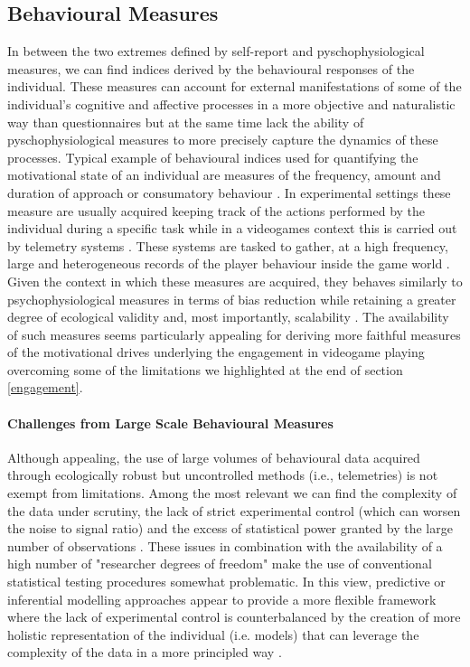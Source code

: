 \subsection{Behavioural Measures}
\label{behavioural_indices}
In between the two extremes defined by self-report and pyschophysiological measures, we can find indices derived by the behavioural responses of the individual. These measures can account for external manifestations of some of the individual's cognitive and affective processes in a more objective and naturalistic way than questionnaires but at the same time lack the ability of pyschophysiological measures to more precisely capture the dynamics of these processes. Typical example of behavioural indices used for quantifying the motivational state of an individual are measures of the frequency, amount and duration of approach or consumatory behaviour \cite{berridge2004motivation, simpson2016behavioral}. In experimental settings these measure are usually acquired keeping track of the actions performed by the individual during a specific task \cite{berridge2009dissecting, simpson2016behavioral} while in a videogames context this is carried out by telemetry systems \cite{el2016game}. These systems are tasked to gather, at a high frequency,  large and heterogeneous records of the player behaviour inside the game world \cite{el2016game}. Given the context in which these measures are acquired, they behaves similarly to psychophysiological measures in terms of bias reduction while retaining a greater degree of ecological validity and, most importantly, scalability \cite{el2016game}. The availability of such measures seems particularly appealing for deriving more faithful measures of the motivational drives underlying the engagement in videogame playing overcoming some of the limitations we highlighted at the end of section \ref{engagement}.
    
\paragraph*{Challenges from Large Scale Behavioural Measures}
\label{challenges_large_scale}
Although appealing, the use of large volumes of behavioural data acquired through ecologically robust but uncontrolled methods (i.e., telemetries) is not exempt from limitations. Among the most relevant we can find the complexity of the data under scrutiny, the lack of strict experimental control (which can worsen the noise to signal ratio) and the excess of statistical power granted by the large number of observations \cite{orben2019association}. These issues in combination with the availability of a high number of "researcher degrees of freedom" \cite{simmons2016false} make the use of conventional statistical testing procedures somewhat problematic. In this view, predictive or inferential modelling approaches appear to provide a more flexible framework where the lack of experimental control is counterbalanced by the creation of more holistic representation of the individual (i.e. models) that can leverage the complexity of the data in a more principled way \cite{yannakakis2013player}.

